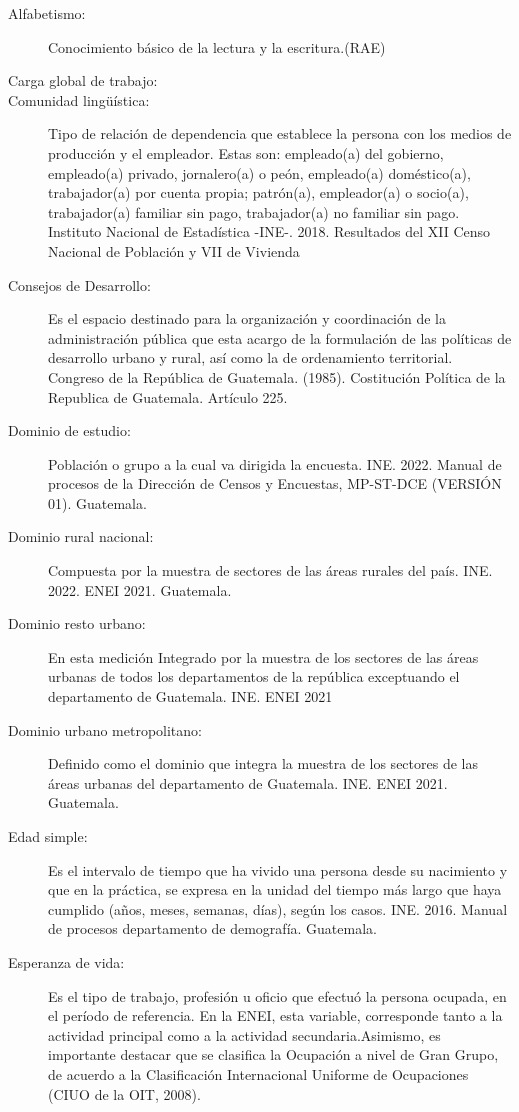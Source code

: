\begin{description}
	\item[Alfabetismo:] Conocimiento básico de la lectura y la escritura.(RAE)
	\item[Carga global de trabajo:] 
	\item[Comunidad lingüística:] Tipo de relación de dependencia que establece la persona con los medios de producción y el empleador. Estas son: empleado(a) del gobierno, empleado(a) privado, jornalero(a) o peón, empleado(a) doméstico(a), trabajador(a) por cuenta propia; patrón(a), empleador(a) o socio(a), trabajador(a) familiar sin pago, trabajador(a) no familiar sin pago. Instituto Nacional de Estadística -INE-. 2018. Resultados del XII Censo Nacional de Población y VII de Vivienda
	\item[Consejos de Desarrollo:] Es el espacio destinado para la organización y coordinación de la administración pública que esta acargo de la formulación de las políticas de desarrollo urbano y rural, así como la de ordenamiento territorial. Congreso de la República de Guatemala. (1985). Costitución Política de la Republica de Guatemala. Artículo 225.
	\item[Dominio de estudio:] Población o grupo a la cual va dirigida la encuesta. INE. 2022. Manual de procesos de la Dirección de Censos y Encuestas, MP-ST-DCE (VERSIÓN 01). Guatemala.
	\item[Dominio rural nacional:] Compuesta por la muestra de sectores de las áreas rurales del país. INE. 2022. ENEI 2021. Guatemala.
	\item[Dominio resto urbano:] En esta medición Integrado por la muestra de los sectores de las áreas urbanas de todos los departamentos de la república exceptuando el departamento de Guatemala. INE. ENEI 2021
	\item[Dominio urbano metropolitano:] Definido como el dominio que integra la muestra de los sectores de las áreas urbanas del departamento de Guatemala. INE. ENEI 2021. Guatemala.
	\item[Edad simple:] Es el intervalo de tiempo que ha vivido una persona desde su nacimiento y que en la práctica, se expresa en la unidad del tiempo más largo que haya cumplido (años, meses, semanas, días), según los casos.	INE. 2016. Manual de procesos departamento de demografía. Guatemala.
	\item[Esperanza de vida:] Es el tipo de trabajo, profesión u oficio que efectuó la persona ocupada, en el período de referencia. En la ENEI, esta variable, corresponde tanto a la actividad principal como a la actividad secundaria.Asimismo, es importante destacar que se clasifica la Ocupación a nivel de Gran Grupo, de acuerdo a la Clasificación Internacional Uniforme de Ocupaciones (CIUO de la OIT, 2008).

\end{description}
